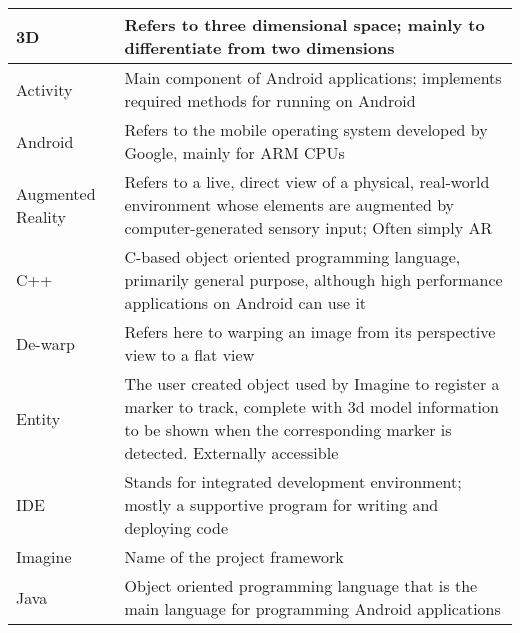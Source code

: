 
\begin{tabulary}{\textwidth}{p{2.5cm}|L}
3D                & Refers to three dimensional space; mainly to differentiate from two dimensions                                                                                                         \\ \hline
    Activity          & Main component of Android applications; implements required methods for running on Android                                                                                             \\ \hline
    Android           & Refers to the mobile operating system developed by Google, mainly for ARM CPUs                                                                                                         \\ \hline
    Augmented Reality & Refers to a live, direct view of a physical, real-world environment whose elements are augmented by computer-generated sensory input\protect \cite{ardef}; Often simply AR             \\ \hline
    C++               & C-based object oriented programming language, primarily general purpose, although high performance applications on Android can use it                                                  \\ \hline
    De-warp           & Refers here to warping an image from its perspective view to a flat view                                                                                                               \\ \hline
    Entity            & The user created object used by Imagine to register a marker to track, complete with 3d model information to be shown when the corresponding marker is detected. Externally accessible \\ \hline
    IDE               & Stands for integrated development environment; mostly a supportive program for writing and deploying code                                                                              \\ \hline
    Imagine           & Name of the project framework                                                                                                                                                          \\ \hline
    Java              & Object oriented programming language that is the main language for programming Android applications                                                                                    \\ \hline

\end{tabulary}
